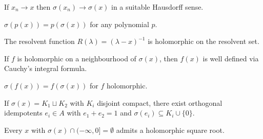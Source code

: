 \begin{theorem}
  \label{thm:spectrum-uppersemiContinuous}
  \leanok
  If $x_n \to x$ then $\sigma(x_n) \to \sigma(x)$ in a suitable
  Hausdorff sense.
\end{theorem}

\begin{theorem}
  \label{thm:spectrum-polynomial}
  \leanok
  $\sigma(p(x)) = p(\sigma(x))$ for any polynomial $p$.
\end{theorem}

\begin{theorem}
  \label{thm:resolvent-holomorphic}
  \leanok
  The resolvent function $R(\lambda) = (\lambda - x)^{-1}$ is
  holomorphic on the resolvent set.
\end{theorem}

\begin{theorem}
  \label{thm:holomorphic-fc}
  \leanok
  If $f$ is holomorphic on a neighbourhood of $\sigma(x)$, then
  $f(x)$ is well defined via Cauchy's integral formula.
\end{theorem}

\begin{theorem}
  \label{thm:spectrum-holomorphic}
  \leanok
  $\sigma(f(x)) = f(\sigma(x))$ for $f$ holomorphic.
\end{theorem}

\begin{theorem}
  \label{thm:shilov-idempotent}
  \leanok
  If $\sigma(x) = K_1 \sqcup K_2$ with $K_i$ disjoint compact, there
  exist orthogonal idempotents $e_i \in A$ with $e_1 + e_2 = 1$ and
  $\sigma(e_i) \subseteq K_i \cup \{0\}$.
\end{theorem}

\begin{theorem}
  \label{thm:banachAlgebra-sqrt}
  \leanok
  Every $x$ with $\sigma(x) \cap (-\infty, 0] = \emptyset$ admits a
  holomorphic square root.
\end{theorem}

